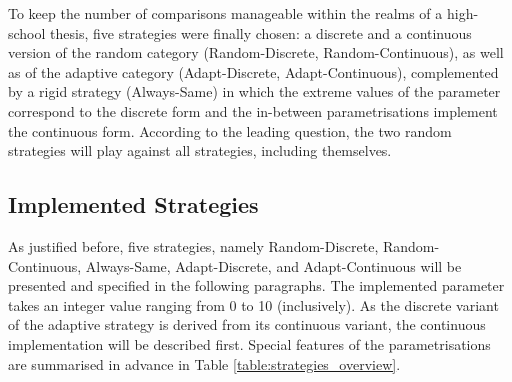 \documentclass[11pt]{article}
\begin{document}
To keep the number of comparisons manageable within the realms of a high-school thesis, five strategies were finally chosen:
a discrete and a continuous version of the random category (Random-Discrete, Random-Continuous), as well as of the adaptive category (Adapt-Discrete, Adapt-Continuous), complemented by a rigid strategy (Always-Same) in which the extreme values of the parameter correspond to the discrete form and the in-between parametrisations implement the continuous form.
According to the leading question, the two random strategies will play against all strategies, including themselves.

%
%

\subsection{Implemented Strategies} \label{sec:implemented_strategies}

As justified before, five strategies, namely Random-Discrete, Random-Continuous, Always-Same, Adapt-Discrete, and Adapt-Continuous will be presented and specified in the following paragraphs.
The implemented parameter takes an integer value ranging from 0 to 10 (inclusively).
As the discrete variant of the adaptive strategy is derived from its continuous variant, the continuous implementation will be described first.
Special features of the parametrisations are summarised in advance in Table \ref{table:strategies_overview}.
	
\end{document}
